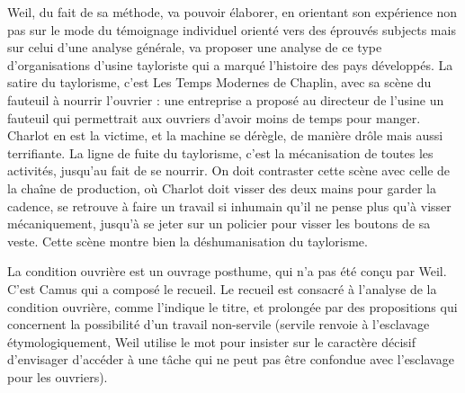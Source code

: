 \documentclass[a4paper,12pt]{book}
\begin{document}
\par Weil, du fait de sa méthode, va pouvoir élaborer, en orientant son expérience non pas sur le mode du témoignage individuel orienté vers des éprouvés subjects mais sur celui d'une analyse générale, va proposer une analyse de ce type d'organisations d'usine tayloriste qui a marqué l'histoire des pays développés. La satire du taylorisme, c'est Les Temps Modernes de Chaplin, avec sa scène du fauteuil à nourrir l'ouvrier : une entreprise a proposé au directeur de l'usine un fauteuil qui permettrait aux ouvriers d'avoir moins de temps pour manger. Charlot en est la victime, et la machine se dérègle, de manière drôle mais aussi terrifiante. La ligne de fuite du taylorisme, c'est la mécanisation de toutes les activités, jusqu'au fait de se nourrir. On doit contraster cette scène avec celle de la chaîne de production, où Charlot doit visser des deux mains pour garder la cadence, se retrouve à faire un travail si inhumain qu'il ne pense plus qu'à visser mécaniquement, jusqu'à se jeter sur un policier pour visser les boutons de sa veste. Cette scène montre bien la déshumanisation du taylorisme.
\par La condition ouvrière est un ouvrage posthume, qui n'a pas été conçu par Weil. C'est Camus qui a composé le recueil. Le recueil est consacré à l'analyse de la condition ouvrière, comme l'indique le titre, et prolongée par des propositions qui concernent la possibilité d'un travail non-servile (servile renvoie à l'esclavage étymologiquement, Weil utilise le mot pour insister sur le caractère décisif d'envisager d'accéder à une tâche qui ne peut pas être confondue avec l'esclavage pour les ouvriers).
\end{document}
